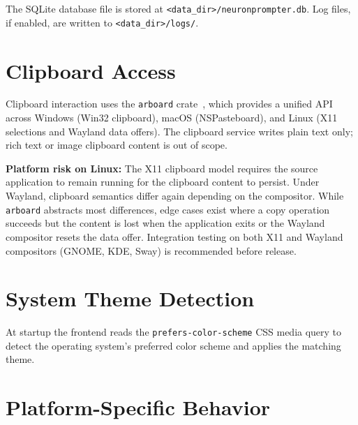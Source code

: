 \documentclass[a4paper, 11pt, oneside]{report}
\begin{document}
The SQLite database file is stored at
\texttt{<data\_dir>/neuronprompter.db}.  Log files, if enabled, are written
to \texttt{<data\_dir>/logs/}.

\section{Clipboard Access}
\label{sec:clipboard}

Clipboard interaction uses the \texttt{arboard} crate~\cite{arboard},
which provides a unified API across Windows (Win32 clipboard), macOS
(NSPasteboard), and Linux (X11 selections and Wayland data offers).
The clipboard service writes plain text only; rich text or image clipboard
content is out of scope.

\textbf{Platform risk on Linux:} The X11 clipboard model requires the
source application to remain running for the clipboard content to persist.
Under Wayland, clipboard semantics differ again depending on the
compositor.  While \texttt{arboard} abstracts most differences, edge cases
exist where a copy operation succeeds but the content is lost when the
application exits or the Wayland compositor resets the data offer.
Integration testing on both X11 and Wayland compositors (GNOME, KDE,
Sway) is recommended before release.

\section{System Theme Detection}
\label{sec:theme-detection}

At startup the frontend reads the
\texttt{prefers\mbox{-}color\mbox{-}scheme} CSS media query to detect
the operating system's preferred color scheme and applies the
matching theme.

\section{Platform-Specific Behavior}
\label{sec:platform-behavior}
\end{document}
